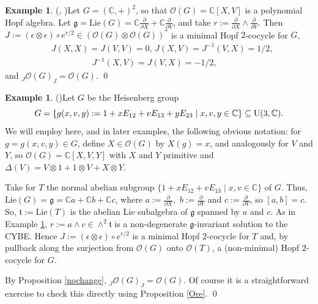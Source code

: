 \documentclass{amsart}
\numberwithin{equation}{section}
\theoremstyle{definition}
\newtheorem{example}[theorem]{Example}
\begin{document}
\begin{example}(\cite[\S 5]{G1}, \cite[\S 6]{G2})\label{ex1} 
Let $G = (\mathbb{C},+)^2$, so that $\mathcal{O}(G) = \mathbb{C}[X,V]$ is a polynomial Hopf algebra. Let $\mathfrak{g} = \mathrm{Lie}(G) = \mathbb{C}\frac{\partial}{\partial{X}} + \mathbb{C}\frac{\partial}{\partial{V}}$, and take $ r:=\frac{\partial}{\partial{X}} \wedge \frac{\partial}{\partial{V}}$. Then $J:=  (\epsilon \otimes \epsilon)\circ e^{r/2}\in \left(\mathcal{O}(G) \otimes \mathcal{O}(G)\right)^*$ is a minimal Hopf $2$-cocycle for $G$,  
\begin{equation}\label{find}
\begin{split} 
& J(X,X) = J(V,V) = 0,\, J(X, V)= J^{-1}(V,X) = 1/2,\\
& \hspace{2cm} J^{-1}(X,V)=J(V,X)=- 1/2,
\end{split} 
\end{equation}
and ${}_J\mathcal{O}(G)_J = \mathcal{O}(G)$. \qed
\end{example}

\begin{example}(\cite[Example 6.1]{G2})\label{ex2} 
Let $G$ be the Heisenberg group 
$$ G =\{g(x,v,y) := 1 + xE_{12} + vE_{13} + yE_{23} \mid x,v,y \in \mathbb{C} \} \subseteq {\rm U}(3, \mathbb{C}). $$
We will employ here, and in later examples, the following obvious notation: for $g = g(x,v,y)\in G$, define $X \in\mathcal{O}(G)$ by $X(g) = x$, and analogously for $V$ and $Y$, so $\mathcal{O}(G)  =  \mathbb{C}[X,V,Y]$ with $X$ and $Y$ primitive and $\Delta (V) =  V \otimes 1 + 1 \otimes V + X \otimes Y$. 

Take for $T$ the normal abelian subgroup $ \{1 + xE_{12} + vE_{13} \mid x,v \in \mathbb{C} \}$ of $G$. Thus, $\mathrm{Lie}(G) = \mathfrak{g} =  \mathbb{C}a + \mathbb{C}b + \mathbb{C}c$, where $a := \frac{\partial}{\partial{X}},$ $ b := \frac{\partial}{\partial{Y}}$ and $c := \frac{\partial}{\partial{V}}$, so $[a,b] = c$. So, $\mathfrak{t} := \mathrm{Lie}(T)$ is the abelian Lie subalgebra of $\mathfrak{g}$ spanned by $a$ and $c$. As in Example \ref{ex1}, $ r  :=  a\wedge c\in \wedge^2\mathfrak{t}$ is a non-degenerate $\mathfrak{g}$-invariant solution to the CYBE.  Hence $J:=(\epsilon \otimes \epsilon) \circ e^{r/2}$ is a minimal Hopf $2$-cocycle for $T$ and, by pullback along the surjection from $\mathcal{O}(G)$ onto $\mathcal{O}(T)$, a (non-minimal) Hopf $2$-cocycle for $G$. 

By Proposition \ref{nochange}, ${}_J\mathcal{O}(G)_J = \mathcal{O}(G)$. Of course it is a straightforward exercise to check this directly using Proposition \ref{Ore}. \qed
\end{example}
\end{document}
